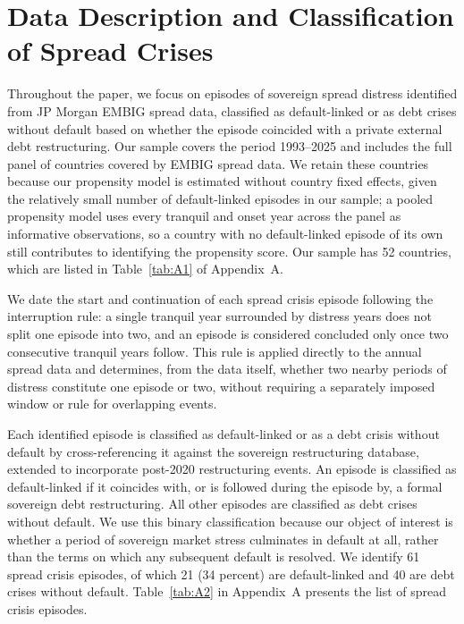 \documentclass[12pt]{article}
\begin{document}
\section{Data Description and Classification of Spread Crises}

Throughout the paper, we focus on episodes of sovereign spread distress
identified from JP Morgan EMBIG spread data, classified as default-linked
or as debt crises without default based on whether the episode coincided
with a private external debt restructuring. Our sample covers the period
1993--2025 and includes the full panel of countries covered by EMBIG
spread data. We retain these countries because our propensity model is
estimated without country fixed effects, given the relatively small
number of default-linked episodes in our sample; a pooled propensity
model uses every tranquil and onset year across the panel as informative
observations, so a country with no default-linked episode of its own
still contributes to identifying the propensity score. Our sample has 52
countries, which are listed in Table~\ref{tab:A1} of Appendix~A.

We date the start and continuation of each spread crisis episode
following the interruption rule: a single tranquil year surrounded by
distress years does not split one episode into two, and an episode is
considered concluded only once two consecutive tranquil years follow.
This rule is applied directly to the annual spread data and determines,
from the data itself, whether two nearby periods of distress constitute
one episode or two, without requiring a separately imposed window or rule
for overlapping events.

Each identified episode is classified as default-linked or as a debt
crisis without default by cross-referencing it against the \citet{asonuma2016sovereign} sovereign restructuring database, extended to incorporate
post-2020 restructuring events. An episode is classified as default-linked
if it coincides with, or is followed during the episode by, a formal
sovereign debt restructuring. All other episodes are classified as debt
crises without default. We use this binary classification because our
object of interest is whether a period of sovereign market stress
culminates in default at all, rather than the terms on which any
subsequent default is resolved. We identify 61 spread crisis episodes, of
which 21 (34 percent) are default-linked and 40 are debt crises without
default. Table~\ref{tab:A2} in Appendix~A presents the list of spread
crisis episodes.
\end{document}
